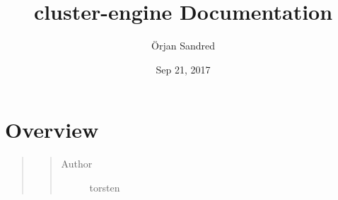 \documentclass[letterpaper,10pt,english]{sphinxmanual}
\title{cluster-engine Documentation}
\date{Sep 21, 2017}
\author{Örjan Sandred}
\begin{document}
\maketitle
\sphinxtableofcontents
{}\label{\detokenize{index::doc}}



\chapter{Overview}
\label{\detokenize{readme::doc}}\label{\detokenize{readme:cluster-engine-documentation}}\label{\detokenize{readme:overview}}\begin{quote}
\begin{quote}\begin{description}
\item[{Author}] \leavevmode
torsten

\end{description}\end{quote}
\end{quote}
\end{document}

